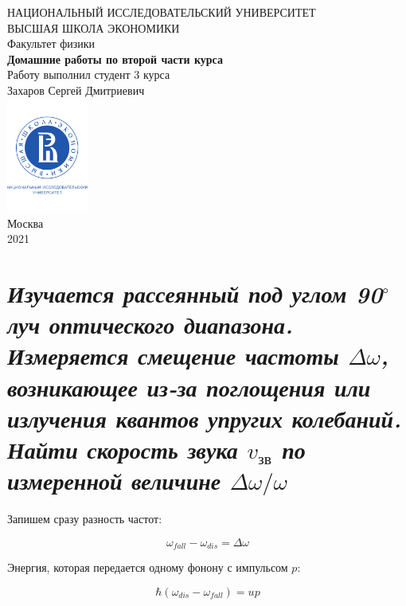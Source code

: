 \documentclass[a4paper, 12pt]{article}
\begin{document}
	\begin{titlepage}
		\begin{center}
			$$$$
			$$$$
			$$$$
			$$$$
			{\Large{НАЦИОНАЛЬНЫЙ ИССЛЕДОВАТЕЛЬСКИЙ УНИВЕРСИТЕТ}}\\
			\vspace{0.1cm}
			{\Large{ВЫСШАЯ ШКОЛА ЭКОНОМИКИ}}\\
			\vspace{0.25cm}
			{\large{Факультет физики}}\\
			\vspace{5.5cm}
			{\Huge\textbf{{Домашние работы по второй части курса}}}\\%
			\vspace{2cm}
			{Работу выполнил студент 3 курса}\\
			{Захаров Сергей Дмитриевич}\\
			\vfill
			\includegraphics[width = 0.2\textwidth]{HSElogo}\\
			\vfill
			Москва\\
			2021
		\end{center}
	\end{titlepage}
	
\tableofcontents


\newpage

\section{\textit{Изучается рассеянный под углом 90$^\circ$ луч оптического диапазона. Измеряется смещение частоты $\Delta \omega$, возникающее из-за поглощения или излучения квантов упругих колебаний. Найти скорость звука $v_{\text{зв}}$ по измеренной величине $\Delta \omega / \omega$}}

Запишем сразу разность частот:

\begin{equation}
	\omega_{fall} - \omega_{dis} = \Delta \omega
\end{equation}

Энергия, которая передается одному фонону с импульсом $p$:

\begin{equation}
	\hbar (\omega_{dis} - \omega_{fall}) = u p
	\label{eq:8_onep}
\end{equation}
\end{document}
